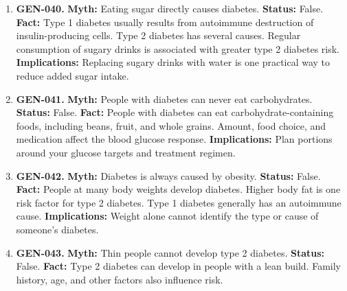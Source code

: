 \documentclass[11pt,oneside]{book}
\begin{document}
\begin{enumerate}[leftmargin=0pt,labelwidth=0pt,labelsep=0pt,itemindent=0pt]
\textbf{Fact:} Coughing cannot reliably treat a heart attack or restore circulation during cardiac arrest. \cite{ref299}\newline
\textbf{Implications:} Call local emergency services for a suspected heart attack. If someone collapses and is unresponsive and not breathing normally, start CPR and use an available AED as directed.
\item[] \textbf{GEN-040.} \textbf{Myth:} Eating sugar directly causes diabetes.\newline
\textbf{Status:} False.\newline
\textbf{Fact:} Type 1 diabetes usually results from autoimmune destruction of insulin-producing cells. Type 2 diabetes has several causes. Regular consumption of sugary drinks is associated with greater type 2 diabetes risk. \cite{ref173,ref224}\newline
\textbf{Implications:} Replacing sugary drinks with water is one practical way to reduce added sugar intake.
\item[] \textbf{GEN-041.} \textbf{Myth:} People with diabetes can never eat carbohydrates.\newline
\textbf{Status:} False.\newline
\textbf{Fact:} People with diabetes can eat carbohydrate-containing foods, including beans, fruit, and whole grains. Amount, food choice, and medication affect the blood glucose response. \cite{ref173}\newline
\textbf{Implications:} Plan portions around your glucose targets and treatment regimen.
\item[] \textbf{GEN-042.} \textbf{Myth:} Diabetes is always caused by obesity.\newline
\textbf{Status:} False.\newline
\textbf{Fact:} People at many body weights develop diabetes. Higher body fat is one risk factor for type 2 diabetes. Type 1 diabetes generally has an autoimmune cause. \cite{ref173,ref224}\newline
\textbf{Implications:} Weight alone cannot identify the type or cause of someone's diabetes.
\item[] \textbf{GEN-043.} \textbf{Myth:} Thin people cannot develop type 2 diabetes.\newline
\textbf{Status:} False.\newline
\textbf{Fact:} Type 2 diabetes can develop in people with a lean build. Family history, age, and other factors also influence risk. \cite{ref173,ref224}\newline

\end{enumerate}
\end{document}
